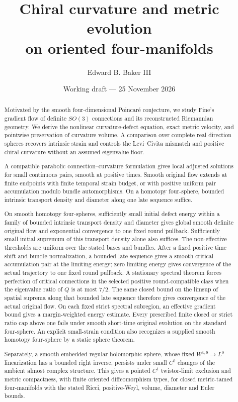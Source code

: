 \documentclass[11pt]{article}
\title{Chiral curvature and metric evolution\\on oriented four-manifolds}
\author{Edward B. Baker III}
\date{Working draft --- 25 November 2026}
\numberwithin{equation}{section}
\theoremstyle{definition}
\theoremstyle{remark}
\begin{document}
\maketitle
\thispagestyle{plain}
\begin{abstract}
Motivated by the smooth four-dimensional Poincar\'e conjecture,
we study Fine's gradient flow of definite $SO(3)$ connections
and its reconstructed Riemannian geometry. We derive the
nonlinear curvature-defect equation, exact metric velocity,
and pointwise preservation of curvature volume. A comparison
over complete real direction spheres recovers intrinsic strain
and controls the Levi--Civita mismatch and positive chiral
curvature without an assumed eigenvalue floor.

A compatible parabolic connection--curvature formulation gives
local adjusted solutions for small continuous pairs, smooth at
positive times. Smooth original flow extends at finite endpoints with
finite temporal strain budget, or with positive uniform pair
accumulation modulo bundle automorphisms. On a homotopy
four-sphere, bounded intrinsic transport density and diameter
along one late sequence suffice.

On smooth homotopy four-spheres, sufficiently small initial
defect energy within a family of
bounded intrinsic transport density and diameter gives global
smooth definite original flow and exponential convergence to
one fixed round pullback. Sufficiently small initial supremum of this transport density
alone also suffices. The non-effective thresholds are uniform
over the stated bases and bundles. After a fixed positive time shift
and bundle normalization, a bounded late sequence gives a
smooth critical accumulation pair at the limiting energy;
zero limiting energy gives convergence of the actual trajectory
to one fixed round pullback. A stationary spectral theorem forces
perfection of critical connections in the selected positive
round-compatible class when the eigenvalue ratio of $Q$ is at
most $7/2$. The same closed bound on the limsup of spatial
suprema along that bounded late sequence therefore gives
convergence of the actual original flow. On each fixed strict
spectral subregion, an effective gradient bound gives a
margin-weighted energy estimate.
Every prescribed finite closed or strict ratio cap above one fails
under smooth short-time original evolution on the standard four-sphere.
An explicit small-strain condition also recognizes a supplied smooth
homotopy four-sphere by a static sphere theorem.

Separately, a smooth embedded regular holomorphic sphere,
whose fixed $W^{1,8}\to L^8$ linearization has a bounded right
inverse, persists under small $C^0$ changes of the ambient
almost complex structure.
This gives a pointed $C^1$ twistor-limit exclusion and metric
compactness, with finite oriented diffeomorphism types, for
closed metric-tamed four-manifolds with the stated Ricci,
positive-Weyl, volume, diameter and Euler bounds.


\end{abstract}
\end{document}
